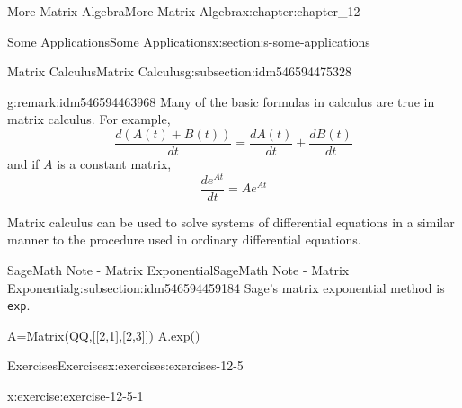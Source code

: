 \documentclass[oneside,10pt,]{book}
\newcommand{\xreffont}{\relax}
\newcommand{\mono}[1]{\texttt{#1}}
\numberwithin{equation}{section}
\begin{document}
\begin{chapterptx}{More Matrix Algebra}{}{More Matrix Algebra}{}{}{x:chapter:chapter_12}
\begin{sectionptx}{Some Applications}{}{Some Applications}{}{}{x:section:s-some-applications}
\begin{subsectionptx}{Matrix Calculus}{}{Matrix Calculus}{}{}{g:subsection:idm546594475328}
\begin{remark}{}{g:remark:idm546594463968}
Many of the basic formulas in calculus are true in matrix calculus. For example,%
\begin{equation*}
\frac{d (A(t)+B(t))}{d t} = \frac{d A(t)}{d t}+ \frac{d B(t)}{d t}
\end{equation*}
and if \(A\) is a constant matrix,%
\begin{equation*}
\frac{d e^{A t}}{d t}= A e^{A t}
\end{equation*}
%
\par
Matrix calculus can be used to solve systems of differential equations in a similar manner  to the procedure used in ordinary differential equations.%
\end{remark}
\end{subsectionptx}
%
%
\typeout{************************************************}
\typeout{************************************************}
%
\begin{subsectionptx}{SageMath Note - Matrix Exponential}{}{SageMath Note - Matrix Exponential}{}{}{g:subsection:idm546594459184}
%
Sage's matrix exponential method is \mono{exp}.%
\begin{sageinput}
A=Matrix(QQ,[[2,1],[2,3]])
A.exp()
\end{sageinput}
\begin{sageoutput}
[1/3*e^4 + 2/3*e 1/3*e^4 - 1/3*e]
[2/3*e^4 - 2/3*e 2/3*e^4 + 1/3*e]
\end{sageoutput}
\end{subsectionptx}
%
%
\typeout{************************************************}
\typeout{************************************************}
%
\begin{exercises-subsection}{Exercises}{}{Exercises}{}{}{x:exercises:exercises-12-5}
\begin{divisionexercise}{1}{}{}{x:exercise:exercise-12-5-1}%
%
\end{divisionexercise}
\end{exercises-subsection}
\end{sectionptx}
\end{chapterptx}
\end{document}
